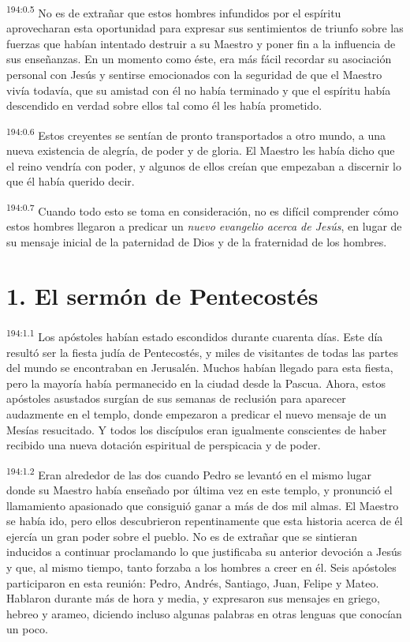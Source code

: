 \par 
\textsuperscript{194:0.5} No es de extrañar que estos hombres infundidos por el espíritu aprovecharan esta oportunidad para expresar sus sentimientos de triunfo sobre las fuerzas que habían intentado destruir a su Maestro y poner fin a la influencia de sus enseñanzas. En un momento como éste, era más fácil recordar su asociación personal con Jesús y sentirse emocionados con la seguridad de que el Maestro vivía todavía, que su amistad con él no había terminado y que el espíritu había descendido en verdad sobre ellos tal como él les había prometido.

\par 
\textsuperscript{194:0.6} Estos creyentes se sentían de pronto transportados a otro mundo, a una nueva existencia de alegría, de poder y de gloria. El Maestro les había dicho que el reino vendría con poder, y algunos de ellos creían que empezaban a discernir lo que él había querido decir.

\par 
\textsuperscript{194:0.7} Cuando todo esto se toma en consideración, no es difícil comprender cómo estos hombres llegaron a predicar un \textit{nuevo evangelio acerca de Jesús}, en lugar de su mensaje inicial de la paternidad de Dios y de la fraternidad de los hombres.

\section*{1. El sermón de Pentecostés}
\par 
\textsuperscript{194:1.1} Los apóstoles habían estado escondidos durante cuarenta días. Este día resultó ser la fiesta judía de Pentecostés, y miles de visitantes de todas las partes del mundo se encontraban en Jerusalén. Muchos habían llegado para esta fiesta, pero la mayoría había permanecido en la ciudad desde la Pascua. Ahora, estos apóstoles asustados surgían de sus semanas de reclusión para aparecer audazmente en el templo, donde empezaron a predicar el nuevo mensaje de un Mesías resucitado. Y todos los discípulos eran igualmente conscientes de haber recibido una nueva dotación espiritual de perspicacia y de poder.

\par 
\textsuperscript{194:1.2} Eran alrededor de las dos cuando Pedro se levantó en el mismo lugar donde su Maestro había enseñado por última vez en este templo, y pronunció el llamamiento apasionado que consiguió ganar a más de dos mil almas. El Maestro se había ido, pero ellos descubrieron repentinamente que esta historia acerca de él ejercía un gran poder sobre el pueblo. No es de extrañar que se sintieran inducidos a continuar proclamando lo que justificaba su anterior devoción a Jesús y que, al mismo tiempo, tanto forzaba a los hombres a creer en él. Seis apóstoles participaron en esta reunión: Pedro, Andrés, Santiago, Juan, Felipe y Mateo. Hablaron durante más de hora y media, y expresaron sus mensajes en griego, hebreo y arameo, diciendo incluso algunas palabras en otras lenguas que conocían un poco.

